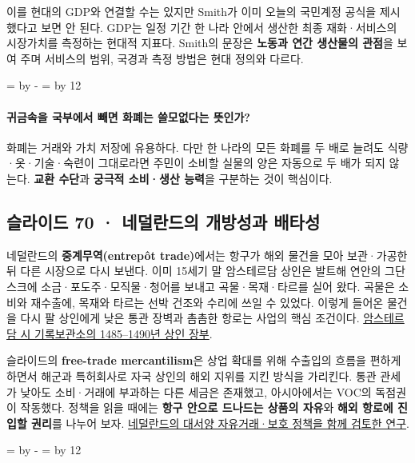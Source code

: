 \documentclass[10pt,a4paper]{article}
\newcommand{\ReserveQuestionSpace}{%
  \par\begingroup
  \dimen0=\pagegoal \advance\dimen0 by -\pagetotal
  \dimen2=\baselineskip \multiply\dimen2 by 12
  \ifdim\dimen0<\dimen2 \newpage\fi
  \endgroup}
\begin{document}
이를 현대의 GDP와 연결할 수는 있지만 Smith가 이미 오늘의 국민계정 공식을 제시했다고 보면 안 된다. GDP는 일정 기간 한 나라 안에서 생산한 최종 재화·서비스의 시장가치를 측정하는 현대적 지표다. Smith의 문장은 \textbf{노동과 연간 생산물의 관점}을 보여 주며 서비스의 범위, 국경과 측정 방법은 현대 정의와 다르다.\par

\ReserveQuestionSpace
\paragraph{귀금속을 국부에서 빼면 화폐는 쓸모없다는 뜻인가?}
화폐는 거래와 가치 저장에 유용하다. 다만 한 나라의 모든 화폐를 두 배로 늘려도 식량·옷·기술·숙련이 그대로라면 주민이 소비할 실물의 양은 자동으로 두 배가 되지 않는다. \textbf{교환 수단}과 \textbf{궁극적 소비·생산 능력}을 구분하는 것이 핵심이다.\par

\subsection{슬라이드 70 · 네덜란드의 개방성과 배타성}
네덜란드의 \textbf{중계무역(entrepôt trade)}에서는 항구가 해외 물건을 모아 보관·가공한 뒤 다른 시장으로 다시 보낸다. 이미 15세기 말 암스테르담 상인은 발트해 연안의 그단스크에 소금·포도주·모직물·청어를 보내고 곡물·목재·타르를 실어 왔다. 곡물은 소비와 재수출에, 목재와 타르는 선박 건조와 수리에 쓰일 수 있었다. 이렇게 들어온 물건을 다시 팔 상인에게 낮은 통관 장벽과 촘촘한 항로는 사업의 핵심 조건이다. \href{https://www.amsterdam.nl/stadsarchief/canon-amsterdam-2008/1485-oudste-koopmansboek/}{암스테르담 시 기록보관소의 1485–1490년 상인 장부}.\par

슬라이드의 \textbf{free-trade mercantilism}은 상업 확대를 위해 수출입의 흐름을 편하게 하면서 해군과 특허회사로 자국 상인의 해외 지위를 지킨 방식을 가리킨다. 통관 관세가 낮아도 소비·거래에 부과하는 다른 세금은 존재했고, 아시아에서는 VOC의 독점권이 작동했다. 정책을 읽을 때에는 \textbf{항구 안으로 드나드는 상품의 자유}와 \textbf{해외 항로에 진입할 권리}를 나누어 보자. \href{https://www.cambridge.org/core/books/abs/merchant-organization-and-maritime-trade-in-the-north-atlantic-16601815/breaching-the-mercantile-barriers-of-the-dutch-colonial-empire-north-american-trade-with-surinam-during-the-eighteenth-century/A813078B204754447E4FFEEA879B464B}{네덜란드의 대서양 자유거래·보호 정책을 함께 검토한 연구}.\par

\ReserveQuestionSpace
\end{document}
